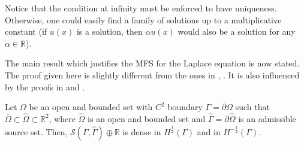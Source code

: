 \begin{remark}
    Notice that the condition at infinity must be enforced to have uniqueness. Otherwise, one could easily find a family of solutions up to a multiplicative constant (if \(u(x)\) is a solution, then \(\alpha u(x)\) would also be a solution for any \(\alpha \in \mathbb{R}\)).
\end{remark}
The main result which justifies the \ac{MFS} for the Laplace equation is now stated. The proof given here is slightly different from the ones in \cite{bogomolny1985fundamental}, \cite{alves2009choice}. It is also influenced by the proofs in \cite{svilen_phd} and \cite{smyrlis2009applicability}.
\begin{theorem}\label{MFS_lap_dense}
    Let \(\Omega\) be an open and bounded set with \(C^2\) boundary \(\Gamma = \partial \Omega\) such that \(\overline{\Omega} \subset \hat{\Omega} \subset \mathbb{R}^2\), where \(\hat{\Omega}\) is an open and bounded set and \(\hat{\Gamma} = \partial \hat{\Omega}\) is an admissible source set. Then, \(\mathcal{S}(\Gamma, \hat{\Gamma}) \oplus \mathbb{R}\) is dense in \(H^\frac{1}{2}(\Gamma)\) and in \(H^{-\frac{1}{2}}(\Gamma)\).
\end{theorem}
